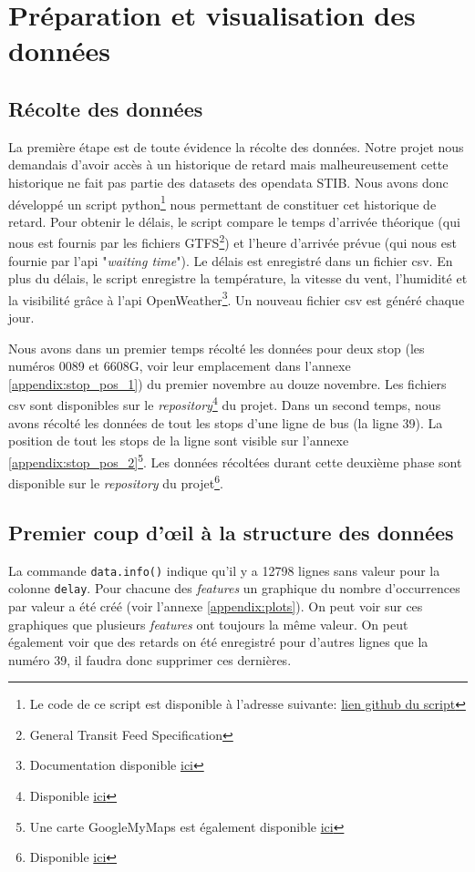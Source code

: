 \chapter{Préparation et visualisation des données}

\section{Récolte des données}
La première étape est de toute évidence la récolte des données. Notre projet nous demandais d'avoir accès à un historique de retard mais malheureusement cette historique ne fait pas partie des datasets des opendata STIB. Nous avons donc développé un script python\footnote{Le code de ce script est disponible à l'adresse suivante: \href{https://github.com/jalbrecq/CanYouCatchIt/blob/main/sandbox/delay_gathering/delay_gathering.py}{lien github du script}} nous permettant de constituer cet historique de retard. Pour obtenir le délais, le script compare le temps d'arrivée théorique (qui nous est fournis par les fichiers GTFS\footnote{General Transit Feed Specification}) et l'heure d'arrivée prévue (qui nous est fournie par l'api "\textit{waiting time}"). Le délais est enregistré dans un fichier csv. En plus du délais, le script enregistre la température, la vitesse du vent, l'humidité et la visibilité grâce à l'api OpenWeather\footnote{Documentation disponible \href{https://openweathermap.org/}{ici}}. Un nouveau fichier csv est généré chaque jour.

Nous avons dans un premier temps récolté les données pour deux stop (les numéros 0089 et 6608G, voir leur emplacement dans l'annexe \ref{appendix:stop_pos_1}) du premier novembre au douze novembre. Les fichiers csv sont disponibles sur le \textit{repository}\footnote{Disponible \href{https://github.com/jalbrecq/CanYouCatchIt/tree/main/sandbox/data/csv}{ici}} du projet. Dans un second temps, nous avons récolté les données de tout les stops d'une ligne de bus (la ligne 39). La position de tout les stops de la ligne sont visible sur l'annexe \ref{appendix:stop_pos_2}\footnote{Une carte GoogleMyMaps est également disponible \href{https://www.google.com/maps/d/edit?mid=1_qNGPUfuZXrqC3UZXkmDOWuhEHJfYAox&usp=sharing}{ici}}. Les données récoltées durant cette deuxième phase sont disponible sur le \textit{repository} du projet\footnote{Disponible \href{https://github.com/jalbrecq/CanYouCatchIt/tree/main/sandbox/data/csv2}{ici}}.

\section{Premier coup d'œil à la structure des données}
La commande \lstinline!data.info()! indique qu'il y a 12798 lignes sans valeur pour la colonne \lstinline!delay!. Pour chacune des \textit{features} un graphique du nombre d'occurrences par valeur a été créé (voir l'annexe \ref{appendix:plots}). On peut voir sur ces graphiques que plusieurs \textit{features} ont toujours la même valeur. On peut également voir que des retards on été enregistré pour d'autres lignes que la numéro 39, il faudra donc supprimer ces dernières.

